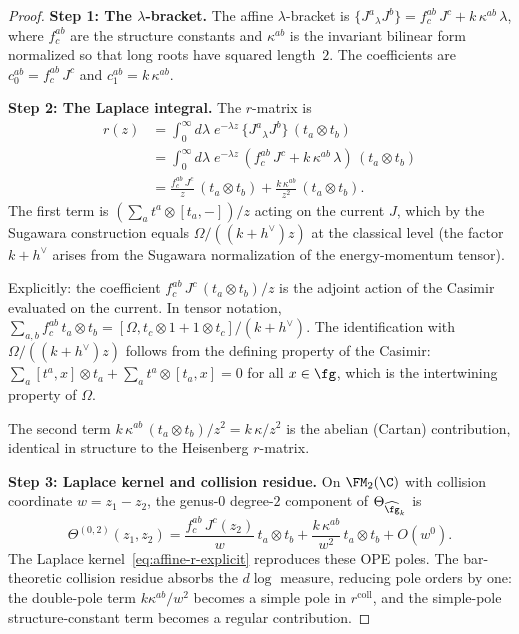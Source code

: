 \begin{proof}
\noindent\textbf{Step 1: The $\lambda$-bracket.}
The affine $\lambda$-bracket is
$\{J^a {}_\lambda J^b\} = f^{ab}_c\, J^c + k\, \kappa^{ab}\, \lambda$,
where $f^{ab}_c$ are the structure constants and $\kappa^{ab}$ is the
invariant bilinear form normalized so that long roots have squared
length~$2$. The coefficients are $c_0^{ab} = f^{ab}_c\, J^c$ and
$c_1^{ab} = k\, \kappa^{ab}$.

\medskip
\noindent\textbf{Step 2: The Laplace integral.}
The $r$-matrix is
\begin{align*}
r(z) &= \int_0^\infty d\lambda\; e^{-\lambda z}\,
\{J^a {}_\lambda J^b\}\, (t_a \otimes t_b) \\
&= \int_0^\infty d\lambda\; e^{-\lambda z}\,
(f^{ab}_c\, J^c + k\,\kappa^{ab}\,\lambda)\,
(t_a \otimes t_b) \\
&= \frac{f^{ab}_c\, J^c}{z}\, (t_a \otimes t_b)
+ \frac{k\,\kappa^{ab}}{z^2}\, (t_a \otimes t_b).
\end{align*}
The first term is $(\sum_a t^a \otimes [t_a, -])/z$ acting on the
current $J$, which by the Sugawara construction equals
$\Omega/((k + h^\vee)z)$ at the classical level (the factor
$k + h^\vee$ arises from the Sugawara normalization of the
energy-momentum tensor).

Explicitly: the coefficient $f^{ab}_c\, J^c\, (t_a \otimes t_b)/z$
is the adjoint action of the Casimir evaluated on the current. In
tensor notation, $\sum_{a,b} f^{ab}_c\, t_a \otimes t_b = [\Omega,
t_c \otimes 1 + 1 \otimes t_c]/(k + h^\vee)$. The identification
with $\Omega/((k + h^\vee)z)$ follows from the defining property
of the Casimir: $\sum_a [t^a, x] \otimes t_a + \sum_a t^a \otimes
[t_a, x] = 0$ for all $x \in \fg$, which is the intertwining
property of $\Omega$.

The second term $k\,\kappa^{ab}\, (t_a \otimes t_b)/z^2 = k\,
\kappa/z^2$ is the abelian (Cartan) contribution, identical in
structure to the Heisenberg $r$-matrix.

\medskip
\noindent\textbf{Step 3: Laplace kernel and collision residue.}
On $\FM_2(\C)$ with collision coordinate $w = z_1 - z_2$, the
genus-$0$ degree-$2$ component of $\Theta_{\widehat{\fg}_k}$ is
\[
\Theta^{(0,2)}(z_1, z_2)
= \frac{f^{ab}_c\, J^c(z_2)}{w}\, t_a \otimes t_b
+ \frac{k\,\kappa^{ab}}{w^2}\, t_a \otimes t_b
+ O(w^0).
\]
The Laplace kernel~\eqref{eq:affine-r-explicit} reproduces these
OPE poles. The bar-theoretic collision residue absorbs the
$d\log$ measure, reducing pole orders by one: the double-pole
term $k\kappa^{ab}/w^2$ becomes a simple pole in
$r^{\mathrm{coll}}$, and the simple-pole structure-constant term
becomes a regular contribution.


\end{proof}
